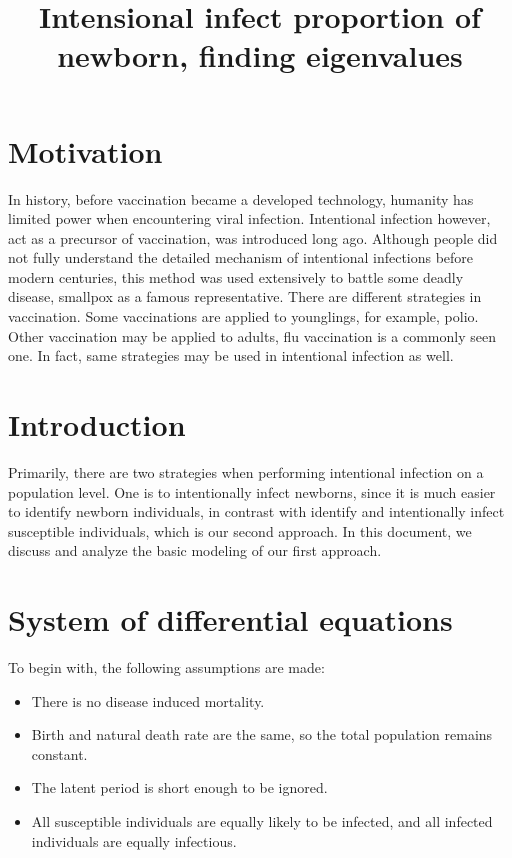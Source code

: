 \documentclass[12pt]{article}
\title{Intensional infect proportion of newborn, finding eigenvalues}
\begin{document}
\linenumbers

\maketitle

\section{Motivation}
In history, before vaccination became a developed technology, humanity has limited power when encountering viral infection. Intentional infection however, act as a precursor of vaccination, was introduced long ago. Although people did not fully understand the detailed mechanism of intentional infections before modern centuries, this method was used extensively to battle some deadly disease, smallpox as a famous representative. There are different strategies in vaccination. Some vaccinations are applied to younglings, for example, polio. Other vaccination may be applied to adults, flu vaccination is a commonly seen one. In fact, same strategies may be used in intentional infection as well.
\section{Introduction}

Primarily, there are two strategies when performing intentional infection on a population level. One is to intentionally infect newborns, since it is much easier to identify newborn individuals, in contrast with identify and intentionally infect susceptible individuals, which is our second approach. In this document, we discuss and analyze the basic modeling of our first approach.

\section{System of differential equations}
To begin with, the following assumptions are made:
\begin{itemize}
\item There is no disease induced mortality.
\item Birth and natural death rate are the same, so the total population remains constant.
\item The latent period is short enough to be ignored.
\item All susceptible individuals are equally likely to be infected, and all infected individuals are equally infectious.
\end{itemize}
\end{document}
